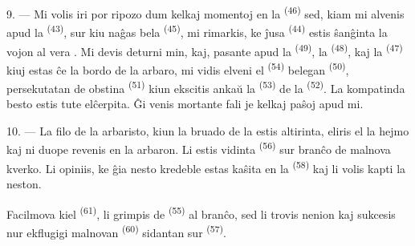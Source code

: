 \VUsaut{3.0mm}
\VUsaut{3.0mm}

9. --- Mi volis iri por ripozo dum kelkaj momentoj en la  \textsuperscript{(46)} sed, kiam mi alvenis apud la 
\textsuperscript{(43)}, sur kiu naĝas bela 
\textsuperscript{(45)}, mi rimarkis, ke ĵusa 
\textsuperscript{(44)} estis ŝanĝinta la vojon al vera . Mi devis
deturni min, kaj, pasante apud la  \textsuperscript{(49)}, la
 \textsuperscript{(48)}, kaj la 
\textsuperscript{(47)} kiuj estas ĉe la bordo de la arbaro, mi vidis elveni el
 \textsuperscript{(54)} belegan 
\textsuperscript{(50)}, persekutatan de obstina 
\textsuperscript{(51)} kiun ekscitis ankaŭ la 
\textsuperscript{(53)} de la  \textsuperscript{(52)}.
La kompatinda besto estis tute elĉerpita. Ĝi venis mortante fali je kelkaj
paŝoj apud mi.

10. --- La filo de la arbaristo, kiun la bruado de la  estis
altirinta, eliris el la hejmo kaj ni duope revenis en la arbaron. Li estis
vidinta  \textsuperscript{(56)} sur branĉo de malnova kverko. Li
opiniis, ke ĝia nesto kredeble estas kaŝita en la 
\textsuperscript{(58)} kaj li volis kapti la neston.

Facilmova kiel  \textsuperscript{(61)}, li grimpis de
 \textsuperscript{(55)} al branĉo, sed li trovis nenion kaj
sukcesis nur ekflugigi malnovan  \textsuperscript{(60)}
sidantan sur  \textsuperscript{(57)}.
\VUsaut{4.0mm}
\VUfilet{22mm}
